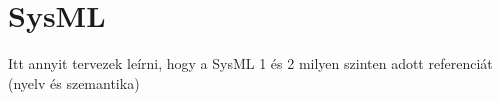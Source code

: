 \section{SysML}


Itt annyit tervezek leírni, hogy a SysML 1 és 2 milyen szinten adott referenciát (nyelv és szemantika)